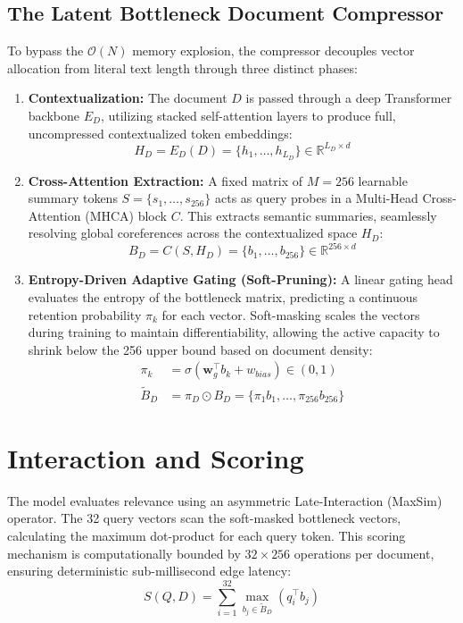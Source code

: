 \documentclass[11pt, a4paper]{article}
\begin{document}
\subsection{The Latent Bottleneck Document Compressor}
To bypass the $\mathcal{O}(N)$ memory explosion, the compressor decouples vector allocation from literal text length through three distinct phases:
\begin{enumerate}
    \item \textbf{Contextualization:} The document $D$ is passed through a deep Transformer backbone $E_D$, utilizing stacked self-attention layers to produce full, uncompressed contextualized token embeddings:
    \begin{equation}
        H_D = E_D(D) = \{h_1, \dots, h_{L_D}\} \in \mathbb{R}^{L_D \times d}
    \end{equation}
    
    \item \textbf{Cross-Attention Extraction:} A fixed matrix of $M=256$ learnable summary tokens $S = \{s_1, \dots, s_{256}\}$ acts as query probes in a Multi-Head Cross-Attention (MHCA) block $C$. This extracts semantic summaries, seamlessly resolving global coreferences across the contextualized space $H_D$:
    \begin{equation}
        B_D = C(S, H_D) = \{b_1, \dots, b_{256}\} \in \mathbb{R}^{256 \times d}
    \end{equation}
    
    \item \textbf{Entropy-Driven Adaptive Gating (Soft-Pruning):} A linear gating head evaluates the entropy of the bottleneck matrix, predicting a continuous retention probability $\pi_k$ for each vector. Soft-masking scales the vectors during training to maintain differentiability, allowing the active capacity to shrink below the 256 upper bound based on document density:
    \begin{align}
        \pi_k &= \sigma(\mathbf{w}_g^\top b_k + w_{bias}) \in (0, 1) \\
        \tilde{B}_D &= \pi_D \odot B_D = \{\pi_1 b_1, \dots, \pi_{256} b_{256}\}
    \end{align}
\end{enumerate}

\section{Interaction and Scoring}
The model evaluates relevance using an asymmetric Late-Interaction (MaxSim) operator. The 32 query vectors scan the soft-masked bottleneck vectors, calculating the maximum dot-product for each query token. This scoring mechanism is computationally bounded by $32 \times 256$ operations per document, ensuring deterministic sub-millisecond edge latency:
\begin{equation}
    S(Q, D) = \sum_{i=1}^{32} \max_{b_j \in \tilde{B}_D} \left( q_i^\top b_j \right)
\end{equation}
\end{document}

